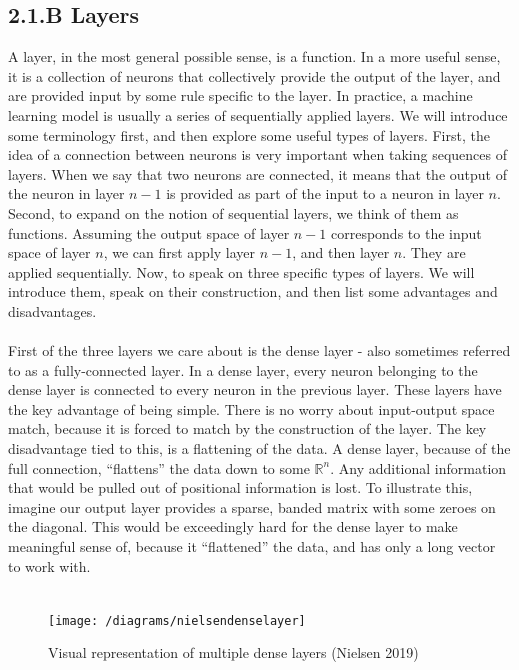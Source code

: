 \documentclass{article}
\begin{document}
\subsection*{2.1.B Layers}
A layer, in the most general possible sense, is a function. In a more useful sense, it is a collection of neurons that collectively provide the output of the layer, and are provided input by some rule specific to the layer. In practice, a machine learning model is usually a series of sequentially applied layers. We will introduce some terminology first, and then explore some useful types of layers. First, the idea of a connection between neurons is very important when taking sequences of layers. When we say that two neurons are connected, it means that the output of the neuron in layer $n-1$ is provided as part of the input to a neuron in layer $n$. Second, to expand on the notion of sequential layers, we think of them as functions. Assuming the output space of layer $n-1$ corresponds to the input space of layer $n$, we can first apply layer $n-1$, and then layer $n$. They are applied sequentially. Now, to speak on three specific types of layers. We will introduce them, speak on their construction, and then list some advantages and disadvantages.\\\\

First of the three layers we care about is the dense layer - also sometimes referred to as a fully-connected layer. In a dense layer, every neuron belonging to the dense layer is connected to every neuron in the previous layer. These layers have the key advantage of being simple. There is no worry about input-output space match, because it is forced to match by the construction of the layer. The key disadvantage tied to this, is a flattening of the data. A dense layer, because of the full connection, “flattens” the data down to some $\mathbb{R}^n$. Any additional information that would be pulled out of positional information is lost. To illustrate this, imagine our output layer provides a sparse, banded matrix with some zeroes on the diagonal. This would be exceedingly hard for the dense layer to make meaningful sense of, because it “flattened” the data, and has only a long vector to work with.\\\\
\begin{figure}[H]
\texttt{[image: /diagrams/nielsendenselayer]}
\caption{Visual representation of multiple dense layers (Nielsen 2019)}
\end{figure}
\end{document}
